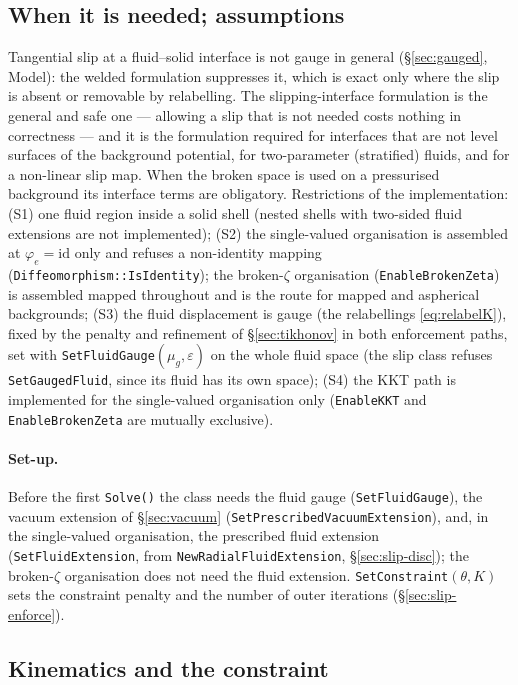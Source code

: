 \documentclass[11pt]{article}
\numberwithin{equation}{section}
\theoremstyle{remark}
\newcommand{\eps}{\varepsilon}
\newcommand{\code}[1]{\texttt{#1}}
\begin{document}
\subsection{When it is needed; assumptions}

Tangential slip at a fluid--solid interface is not gauge in general
(\S\ref{sec:gauged}, Model): the welded formulation suppresses it, which
is exact only where the slip is absent or removable by relabelling. The
slipping-interface formulation is the general and safe one --- allowing
a slip that is not needed costs nothing in correctness --- and it is the
formulation required for interfaces that are not level surfaces of the
background potential, for two-parameter (stratified) fluids, and for a
non-linear slip map. When the broken space is used on a pressurised
background its interface terms are obligatory. Restrictions of the
implementation: (S1) one fluid region inside a solid shell (nested shells
with two-sided fluid extensions are not implemented); (S2) the
single-valued organisation is assembled at $\varphi_e = \mathrm{id}$ only
and refuses a non-identity mapping (\code{Diffeomorphism::IsIdentity}); the
broken-$\zeta$ organisation (\code{EnableBrokenZeta}) is assembled mapped
throughout and is the route for mapped and aspherical backgrounds; (S3)
the fluid displacement is gauge (the relabellings \eqref{eq:relabelK}),
fixed by the penalty and refinement of \S\ref{sec:tikhonov} in both
enforcement paths, set with \code{SetFluidGauge}$(\mu_g,\eps)$ on the whole
fluid space (the slip class refuses \code{SetGaugedFluid}, since its fluid
has its own space); (S4) the KKT path is implemented for the single-valued
organisation only (\code{EnableKKT} and \code{EnableBrokenZeta} are
mutually exclusive).

\paragraph{Set-up.} Before the first \code{Solve()} the class needs the
fluid gauge (\code{SetFluidGauge}), the vacuum extension of
\S\ref{sec:vacuum} (\code{SetPrescribedVacuumExtension}), and, in the
single-valued organisation, the prescribed fluid extension
(\code{SetFluidExtension}, from \code{NewRadialFluidExtension},
\S\ref{sec:slip-disc}); the broken-$\zeta$ organisation does not need the
fluid extension. \code{SetConstraint}$(\theta, K)$ sets the constraint
penalty and the number of outer iterations (\S\ref{sec:slip-enforce}).

\subsection{Kinematics and the constraint}
\end{document}
